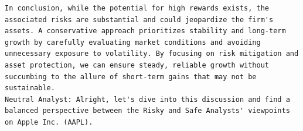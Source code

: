 \begin{tcolorbox}
\begin{lstlisting}[style=agentbase]
In conclusion, while the potential for high rewards exists, the associated risks are substantial and could jeopardize the firm's assets. A conservative approach prioritizes stability and long-term growth by carefully evaluating market conditions and avoiding unnecessary exposure to volatility. By focusing on risk mitigation and asset protection, we can ensure steady, reliable growth without succumbing to the allure of short-term gains that may not be sustainable.
Neutral Analyst: Alright, let's dive into this discussion and find a balanced perspective between the Risky and Safe Analysts' viewpoints on Apple Inc. (AAPL).

\end{lstlisting}
\end{tcolorbox}

